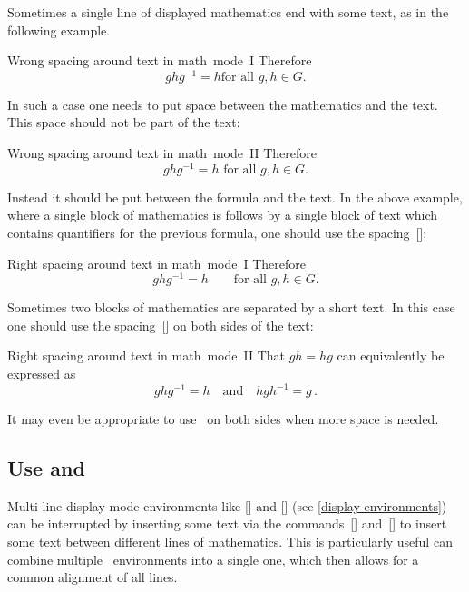 Sometimes a single line of displayed mathematics end with some text, as in the following example.
\begin{showlatex}{Wrong spacing around text in math~mode~I}
Therefore
\[
  g h g^{-1}
  =
  h
  \text{for all $g, h \in G$}.
\]
\end{showlatex}
In such a case one needs to put space between the mathematics and the text.
This space should not be part of the text:
\begin{showlatex}{Wrong spacing around text in math~mode~II}
Therefore
\[
  g h g^{-1}
  =
  h
  \text{ for all $g, h \in G$.}
\]
\end{showlatex}
Instead it should be put between the formula and the text.
In the above example, where a single block of mathematics is follows by a single block of text which contains quantifiers for the previous formula, one should use the spacing~[\comname]:
\begin{showlatex}{Right spacing around text in math~mode~I}
Therefore
\[
  g h g^{-1}
  =
  h
  \qquad
  \text{for all $g, h \in G$.}
\]
\end{showlatex}
Sometimes two blocks of mathematics are separated by a short text.
In this case one should use the spacing~[\comname] on both sides of the text:
\begin{showlatex}{Right spacing around text in math~mode~II}
That $gh = hg$ can equivalently be expressed as
\[
  g h g^{-1} = h
  \quad\text{and}\quad
  h g h^{-1} = g \,.
\]
\end{showlatex}
It may even be appropriate to use~ on both sides when more space is needed.



\subsection{Use  and }

Multi-line display mode environments like [\envname] and [\envname] (see \cref{display environments}) can be interrupted by inserting some text via the commands~[\comname] and~[\comname] to insert some text between different lines of mathematics.
This is particularly useful can combine multiple ~environments into a single one, which then allows for a common alignment of all lines.


